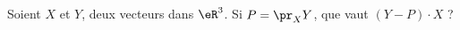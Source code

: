 
\begin{exercice}\label{exoOutilsMath-0020}

	Soient $X$ et $Y$, deux vecteurs dans $\eR^3$. Si $P=\pr_XY$, que vaut $(Y-P)\cdot X$ ?

\end{exercice}
